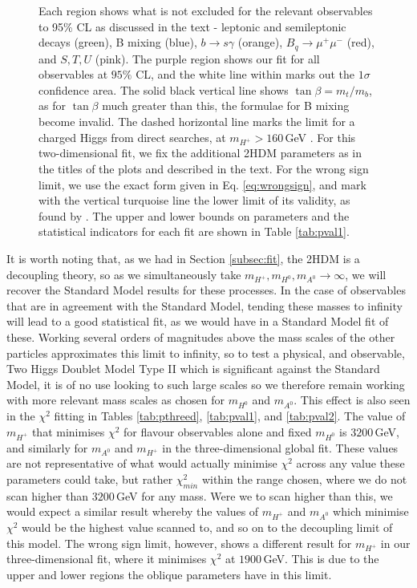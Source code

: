 \documentclass[a4paper,12pt]{article}
\begin{document}
\begin{figure}[ht]
{    Each region shows what is not excluded for the relevant observables to 95\% CL as discussed in the text - leptonic and semileptonic decays (green), B mixing (blue), $b\to s\gamma$ (orange), $B_q\to\mu^+\mu^-$ (red), and $S,T,U$ (pink).
    The purple region shows our fit for all observables at $95\%$ CL, and the white line within marks out the $1\sigma$ confidence area. 
    The solid black vertical line shows $\tan\beta=m_t/m_b$, as for $\tan\beta$ much greater than this, the formulae for B mixing become invalid. 
    The dashed horizontal line marks the limit for a charged Higgs from direct searches, at $m_{H^+}>160\,$GeV \cite{dirhp}.
    For this two-dimensional fit, we fix the additional 2HDM parameters as in the titles of the plots and described in the text. 
    For the wrong sign limit, we use the exact form given in Eq. \ref{eq:wrongsign}, and mark with the vertical turquoise line the lower limit of its validity, as found by \cite{oliver}.
    The upper and lower bounds on parameters and the statistical indicators for each fit are shown in Table \ref{tab:pval1}.}
\end{figure}

It is worth noting that, as we had in Section \ref{subsec:fit}, the 2HDM is a decoupling theory, so as we simultaneously take $m_{H^+},m_{H^0},m_{A^0}\to\infty$, we will recover the Standard Model results for these processes.
In the case of observables that are in agreement with the Standard Model, tending these masses to infinity will lead to a good statistical fit, as we would have in a Standard Model fit of these. 
Working several orders of magnitudes above the mass scales of the other particles approximates this limit to infinity, so to test a physical, and observable, Two Higgs Doublet Model Type II which is significant against the Standard Model, it is of no use looking to such large scales so we therefore remain working with more relevant mass scales as chosen for $m_{H^0}$ and $m_{A^0}$.
This effect is also seen in the $\chi^2$ fitting in Tables \ref{tab:pthreed}, \ref{tab:pval1}, and \ref{tab:pval2}. 
The value of $m_{H^+}$ that minimises $\chi^2$ for flavour observables alone and fixed $m_{H^0}$ is $3200\,$GeV, and similarly for $m_{A^0}$ and $m_{H^+}$ in the three-dimensional global fit. 
These values are not representative of what would actually minimise $\chi^2$ across any value these parameters could take, but rather $\chi^2_{min}$ within the range chosen, where we do not scan higher than $3200\,$GeV for any mass. 
Were we to scan higher than this, we would expect a similar result whereby the values of $m_{H^+}$ and $m_{A^0}$ which minimise $\chi^2$ would be the highest value scanned to, and so on to the decoupling limit of this model. 
The wrong sign limit, however, shows a different result for $m_{H^+}$ in our three-dimensional fit, where it minimises $\chi^2$ at $1900\,$GeV.
This is due to the upper and lower regions the oblique parameters have in this limit.
\end{document}
